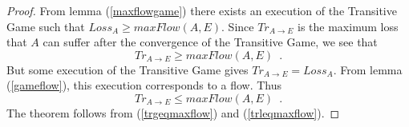 \begin{proof}%
   From lemma (\ref{maxflowgame}) there exists an execution of the Transitive Game such that
   $Loss_A \geq maxFlow\left(A, E\right)$.
   Since $Tr_{A \rightarrow E}$ is the maximum loss that $A$ can suffer after the convergence of the Transitive Game, we
   see that
   \begin{equation}
   \label{trgeqmaxflow}
      Tr_{A \rightarrow E} \geq maxFlow\left(A, E\right) \enspace.
   \end{equation}
   But some execution of the Transitive Game gives $Tr_{A \rightarrow E} = Loss_A$.
   From lemma (\ref{gameflow}), this execution corresponds to a flow. Thus
   \begin{equation}
   \label{trleqmaxflow}
      Tr_{A \rightarrow E} \leq maxFlow\left(A, E\right) \enspace.
   \end{equation}
   The theorem follows from (\ref{trgeqmaxflow}) and (\ref{trleqmaxflow}).
\end{proof}
